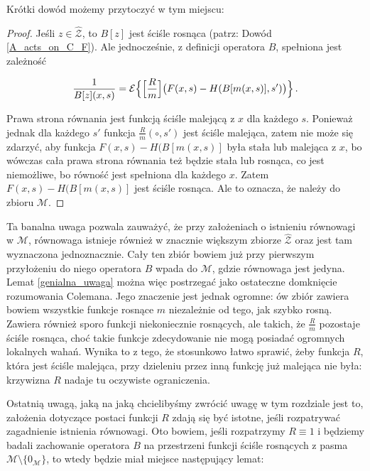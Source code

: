 Krótki dowód możemy przytoczyć w tym miejscu:

\begin{proof} Jeśli $z \in \hat{\mathcal{Z}}$, to $B[z]$ jest ściśle rosnąca (patrz: Dowód \ref{A_acts_on_C_F}). Ale jednocześnie, z definicji operatora $B$, spełniona jest zależność

\begin{equation*}
	\frac{1}{B[z](x,s)} = \mathcal{E} \Bigl \{ \Big[\frac{R}{m}\Big] \bigl( F(x,s) - H(B[m(x,s)],s')\bigl) \Bigl\}\,.
\end{equation*}

Prawa strona równania jest funkcją ściśle malejącą z $x$ dla każdego $s$. Ponieważ jednak dla każdego $s'$ funkcja $\frac{R}{m}(\circ, s')$ jest ściśle malejąca, zatem nie może się zdarzyć, aby funkcja $F(x,s) - H(B[m(x,s)]$ była stała lub malejąca z $x$, bo wówczas cała prawa strona równania też będzie stała lub rosnąca, co jest niemożliwe, bo równość jest spełniona dla każdego $x$. Zatem $F(x,s) - H(B[m(x,s)]$ jest ściśle rosnąca. Ale to oznacza, że należy do zbioru $\mathcal{M}$. 
\end{proof}

Ta banalna uwaga pozwala zauważyć, że przy założeniach o istnieniu równowagi w $\mathcal{M}$, równowaga istnieje również w znacznie większym zbiorze $\hat{\mathcal{Z}}$ oraz jest tam wyznaczona jednoznacznie. Cały ten zbiór bowiem już przy pierwszym przyłożeniu do niego operatora $B$ wpada do $\mathcal{M}$, gdzie równowaga jest jedyna. Lemat \ref{genialna_uwaga} można więc postrzegać jako ostateczne domknięcie rozumowania Colemana. Jego znaczenie jest jednak ogromne: ów zbiór zawiera bowiem wszystkie funkcje rosnące $m$ niezależnie od tego, jak szybko rosną. Zawiera również sporo funkcji niekoniecznie rosnących, ale takich, że $\frac{R}{m}$ pozostaje ściśle rosnąca, choć takie funkcje zdecydowanie nie mogą posiadać ogromnych lokalnych wahań. Wynika to z tego, że stosunkowo łatwo sprawić, żeby funkcja $R$, która jest ściśle malejąca, przy dzieleniu przez inną funkcję już malejąca nie była: krzywizna $R$ nadaje tu oczywiste ograniczenia. 


	Ostatnią uwagą, jaką na jaką chcielibyśmy zwrócić uwagę w tym rozdziale jest to, założenia dotyczące postaci funkcji $R$ zdają się być istotne, jeśli rozpatrywać zagadnienie istnienia równowagi. Oto bowiem, jeśli rozpatrzymy $R \equiv 1$ i będziemy badali zachowanie operatora $B$ na przestrzeni funkcji ściśle rosnących z pasma $\mathcal{M}\setminus\{ 0_{\mathcal{M}}\}$, to wtedy będzie miał miejsce następujący lemat:

